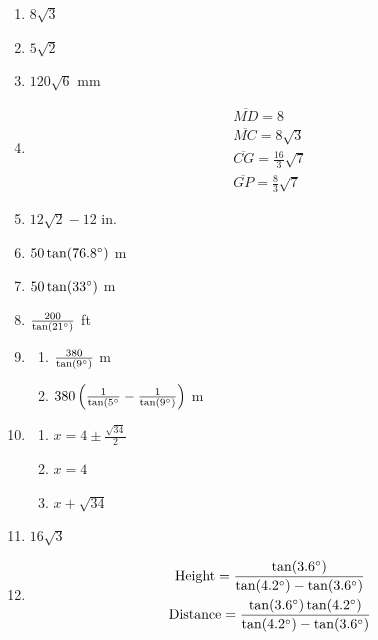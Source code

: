 \documentclass{article}
\begin{document}
\begin{enumerate}
\item $8\sqrt{3}$

\item $5\sqrt{2}$

\item $120\sqrt{6}$ mm

\item
	\begin{gather*}
	\overline{MD} = 8 \\
	\overline{MC} = 8\sqrt{3} \\
	\overline{CG} = \frac{16}{3}\sqrt{7} \\
	\overline{GP} = \frac{8}{3}\sqrt{7}
	\end{gather*}
	
\item $12\sqrt{2} - 12$ in.

\item $50\tan(76.8\degree)$ m

\item $50 \tan(33 \degree)$ m

\item $\frac{200}{\tan(21\degree)}$ ft

\item

	\begin{enumerate}
	
	\item $\frac{380}{\tan(9\degree)}$ m
	
	\item $380 \left( \frac{1}{\tan(5\degree} - \frac{1}{\tan(9\degree)} \right)$ m
	
	\end{enumerate}
	
\item

	\begin{enumerate}
	
	\item $x = 4 \pm \frac{\sqrt{34}}{2}$
	
	\item $x = 4$
	
	\item $x + \sqrt{34}$
	
	\end{enumerate}
	
\item $16\sqrt{3}$

\item \begin{gather*}
	\text{Height} = \frac{\tan(3.6\degree)}{\tan(4.2\degree) - \tan(3.6\degree)} \\
	\text{Distance} = \frac{\tan(3.6\degree)\tan(4.2\degree)}{\tan(4.2\degree) - \tan(3.6\degree)}
	\end{gather*}
	

\end{enumerate}
\end{document}
